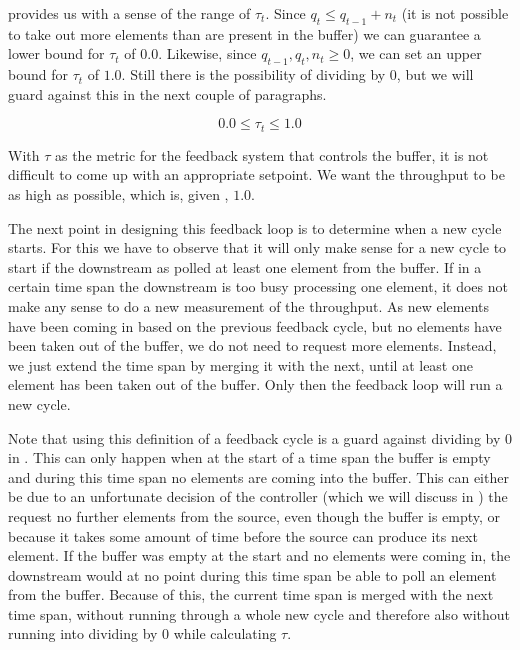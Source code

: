  provides us with a sense of the range of $\tau_t$. Since $q_t \leq q_{t-1} + n_t$ (it is not possible to take out more elements than are present in the buffer) we can guarantee a lower bound for $\tau_t$ of $0.0$. Likewise, since $q_{t-1}, q_t, n_t \geq 0$, we can set an upper bound for $\tau_t$ of $1.0$. Still there is the possibility of dividing by 0, but we will guard against this in the next couple of paragraphs.

\begin{equation}\label{eq:range-of-tau}
0.0 \leq \tau_t \leq 1.0
\end{equation}

With $\tau$ as the metric for the feedback system that controls the buffer, it is not difficult to come up with an appropriate setpoint. We want the throughput to be as high as possible, which is, given , $1.0$.

The next point in designing this feedback loop is to determine when a new cycle starts. For this we have to observe that it will only make sense for a new cycle to start if the downstream as polled at least one element from the buffer. If in a certain time span the downstream is too busy processing one element, it does not make any sense to do a new measurement of the throughput. As new elements have been coming in based on the previous feedback cycle, but no elements have been taken out of the buffer, we do not need to request more elements. Instead, we just extend the time span by merging it with the next, until at least one element has been taken out of the buffer. Only then the feedback loop will run a new cycle.

Note that using this definition of a feedback cycle is a guard against dividing by 0 in . This can only happen when at the start of a time span the buffer is empty and during this time span no elements are coming into the buffer. This can either be due to an unfortunate decision of the controller (which we will discuss in ) the request no further elements from the source, even though the buffer is empty, or because it takes some amount of time before the source can produce its next element. If the buffer was empty at the start and no elements were coming in, the downstream would at no point during this time span be able to poll an element from the buffer. Because of this, the current time span is merged with the next time span, without running through a whole new cycle and therefore also without running into dividing by 0 while calculating $\tau$.

